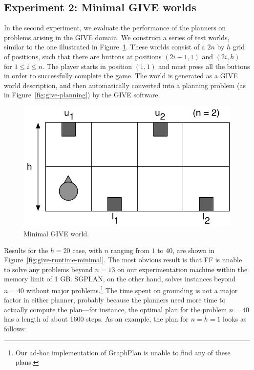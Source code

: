 \subsection{Experiment 2: Minimal GIVE worlds}
\label{sec:exper-2:-minim}

In the second experiment, we evaluate the performance of the planners
on problems arising in the GIVE domain. We construct a series of test
worlds, similar to the one illustrated in
Figure~\ref{fig:give-minimal}. These worlds consist of a $2n$ by $h$
grid of positions, such that there are buttons at positions $(2i-1,1)$
and $(2i,h)$ for $1 \leq i \leq n$. The player starts in position $(1,1)$
and must press all the buttons in order to successfully complete the game.
The world is generated as a GIVE world description, and then automatically
converted into a planning problem (as in Figure~\ref{fig:give-planning}) by
the GIVE software.

\begin{figure}
  \centering
  \includegraphics[width=0.8\columnwidth]{pic-buttons}
  \caption{Minimal GIVE world.}
  \label{fig:give-minimal}
\end{figure}

Results for the $h=20$ case, with $n$ ranging from $1$ to $40$, are
shown in Figure~\ref{fig:give-runtime-minimal}.  The most obvious
result is that FF is unable to solve any problems beyond $n=13$ on our
experimentation machine within the memory limit of 1 GB.  SGPLAN, on
the other hand, solves instances beyond $n=40$ without major
problems.\footnote{Our ad-hoc implementation of GraphPlan is unable to
  find any of these plans.}  The time spent on grounding is not a
major factor in either planner, probably because the planners need
more time to actually compute the plan---for instance, the optimal
plan for the problem $n=40$ has a length of about 1600 steps.  As an
example, the plan for $n=h=1$ looks as follows:

